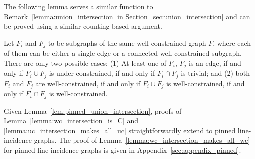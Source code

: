 The following lemma serves a similar function to Remark~\ref{lemma:union_intersection} in Section~\ref{sec:union_intersection}
and can be proved using a similar counting based argument.


\begin{lemma}\label{lem:pinned_union_intersection}
Let $F_i$ and $F_j$ to be subgraphs of the same well-constrained graph $F$,
where each of them can be either a single edge or a connected well-constrained subgraph.
There are only two possible cases:
(1) At least one of $F_i$, $F_j$ is an edge, if and only if $F_i \cup F_j$ is under-constrained, if and only if $F_i \cap F_j$ is trivial; and (2) both $F_i$ and $F_j$ are well-constrained, if and only if $F_i \cup F_j$ is well-constrained, if and only if $F_i \cap F_j$ is well-constrained.
\end{lemma}

Given Lemma~\ref{lem:pinned_union_intersection}, %
proofs of Lemma~\ref{lemma:wc_intersection_is_C} and \ref{lemma:uc_intersection_makes_all_uc} straightforwardly extend to  pinned line-incidence graphs.
The proof of Lemma~\ref{lemma:wc_intersection_makes_all_wc} for pinned
line-incidence graphs is given in Appendix~\ref{sec:appendix_pinned}.

